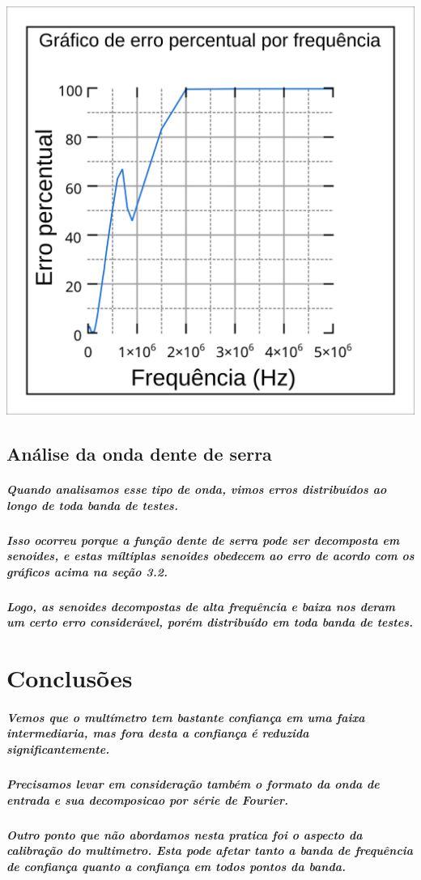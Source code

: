 \documentclass[12pt,twoside, a4paper, twocolumn]{article}
\begin{document}
\begin{adjustbox}{scale=0.30}
    \includegraphics{Grafico2.png}
\end{adjustbox}

\subsection{Análise da onda dente de serra}

\subparagraph*{Quando analisamos esse tipo de onda, vimos erros distribuídos ao longo de toda banda de testes.}

\subparagraph*{Isso ocorreu porque a função dente de serra pode ser decomposta em senoides, e estas míltiplas senoides obedecem ao erro de acordo com os gráficos acima na seção \emph{3.2}.}


\subparagraph*{Logo, as senoides decompostas de alta frequência e baixa nos deram um certo erro considerável, porém distribuído em toda banda de testes.}

\newpage
\section{Conclusões}

\subparagraph*{Vemos que o multímetro tem bastante confiança em uma faixa intermediaria, mas fora desta a confiança é reduzida significantemente.}

\subparagraph*{Precisamos levar em consideração também o formato da onda de entrada e sua decomposicao por série de Fourier.}

\subparagraph*{Outro ponto que não abordamos nesta pratica foi o aspecto da calibração do multimetro. Esta pode afetar tanto a banda de frequência de confiança quanto a confiança em todos pontos da banda.}
\end{document}
